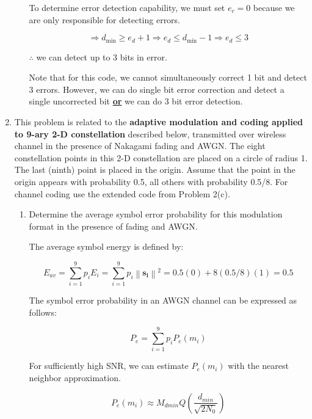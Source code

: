 \documentclass[fleqn]{article}
\newcommand{\norm}[1]{\left \lVert #1 \right \rVert}
\begin{document}
\begin{enumerate}
\begin{enumerate}
			To determine error detection capability, we must set $e_c = 0$ because we are only responsible for detecting errors.
			
			\begin{equation*}
				\Rightarrow d_{\text{min}} \geq e_d + 1 \Rightarrow e_d \leq d_{\text{min}} - 1 \Rightarrow e_d \leq 3
			\end{equation*}
			
			$\therefore$ we can detect up to 3 bits in error.
			
			Note that for this code, we cannot simultaneously correct 1 bit and detect 3 errors. However, we can do single bit error correction and detect a single uncorrected bit \textbf{\underline{or}} we can do 3 bit error detection.
		\end{enumerate}
		
		\item This problem is related to the \textbf{adaptive modulation and coding applied to 9-ary 2-D constellation} described below, transmitted over wireless channel in the presence of Nakagami fading and AWGN. The eight constellation points in this 2-D constellation are placed on a circle of radius 1. The last (ninth) point is placed in the origin. Assume that the point in the origin appears with probability 0.5, all others with probability 0.5/8. For channel coding use the extended code from Problem 2(c).
		
		\begin{enumerate}
			\item Determine the average symbol error probability for this modulation format in the presence of fading and AWGN.
			
			The average symbol energy is defined by:
			
			\begin{equation*}
				E_{av} = \sum_{i=1}^{9}{p_iE_i} = \sum_{i=1}^{9}{p_i\norm{\mathbf{s_i}}^2} = 0.5(0) + 8(0.5/8)(1) = 0.5
			\end{equation*}
			
			The symbol error probability in an AWGN channel can be expressed as follows:
			
			\begin{equation*}
				P_e = \sum_{i=1}^{9}{p_iP_e(m_i)}
			\end{equation*}
				
			For sufficiently high SNR, we can estimate $P_e(m_i)$ with the nearest neighbor approximation.
			
			\begin{equation*}
				P_e(m_i) \approx M_{dmin}Q\left(\frac{d_{min}}{\sqrt{2N_0}}\right)
			\end{equation*}
			

\end{enumerate}
\end{enumerate}
\end{document}
